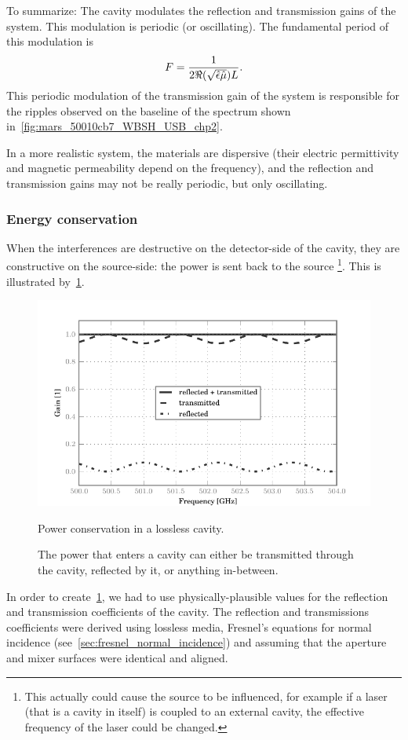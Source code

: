 To summarize:
The cavity modulates the reflection and transmission gains of the system.
This modulation is periodic (or oscillating).
The fundamental period of this modulation is
\begin{equation}
    F = 
    \frac{1}{2\Re(\sqrt{\hat{\epsilon}\hat{\mu}})L}
    \text{.}
    \label{eq:relation_length_period_nice}
\end{equation}
This periodic modulation of the transmission gain of the system is responsible for the ripples observed on the baseline of the spectrum shown in~\cref{fig:mars_50010cb7_WBSH_USB_chp2}.

In a more realistic system, the materials are dispersive (their electric permittivity and magnetic permeability depend on the frequency), and the reflection and transmission gains may not be really periodic, but only oscillating.




\subsubsection{Energy conservation}

When the interferences are destructive on the detector-side of the cavity, they are constructive on the source-side: the power is sent back to the source%
\footnote{
    This actually could cause the source to be influenced,
    for example if a laser (that is a cavity in itself) is coupled to an external cavity,
    the effective frequency of the laser could be changed.
}.
This is illustrated by~\cref{fig:cavity_energy_conservation}.
\begin{figure}
    \centering
    \includegraphics{cavity_energy_conservation}
    \caption{Power conservation in a lossless cavity.}
    \caption*{
        The power that enters a cavity can either be transmitted through the cavity, reflected by it, or anything in-between.
    }
    \label{fig:cavity_energy_conservation}
\end{figure}
In order to create~\cref{fig:cavity_energy_conservation}, we had to use physically-plausible values for the reflection and transmission coefficients of the cavity.
The reflection and transmissions coefficients were derived using lossless media, Fresnel's equations for normal incidence (see~\vref{sec:fresnel_normal_incidence})
and assuming that the aperture and mixer surfaces were identical and aligned.

